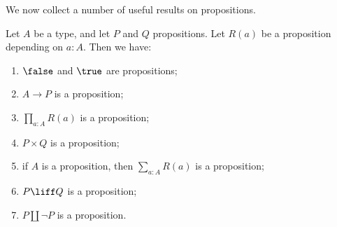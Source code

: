 We now collect a number of useful results on propositions.

\begin{lemma}\label{lem:prop-utils}
Let $A$ be a type, and let $P$ and $Q$ propositions.
Let $R(a)$ be a proposition depending on $a:A$. Then we have:
\begin{enumerate}
\item\label{prop-utils-false-true} $\false$ and $\true$ are propositions;
\item\label{prop-utils-codom} $A\to P$ is a proposition;
\item\label{prop-utils-pi} $\prod_{a:A} R(a)$ is a proposition;
\item\label{prop-utils-times} $P\times Q$ is a proposition;
\item\label{prop-utils-sum} if $A$ is a proposition, then $\sum_{a:A} R(a)$ is a proposition;
\item\label{prop-utils-eq} $P \liff Q$ is a proposition;
\item\label{prop-utils-lem} $P \amalg \neg P$ is a proposition.
\end{enumerate}
\end{lemma}


